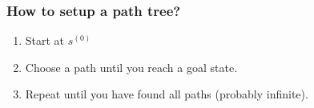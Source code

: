 \subsubsection{How to setup a path tree?}
\begin{process} 
    \begin{enumerate}
        \item Start at $s^{(0)}$
        \item Choose a path until you reach a goal state.
        \item Repeat until you have found all paths (probably infinite).
    \end{enumerate}
\end{process}

\begin{example}
\end{example}

\newpage

